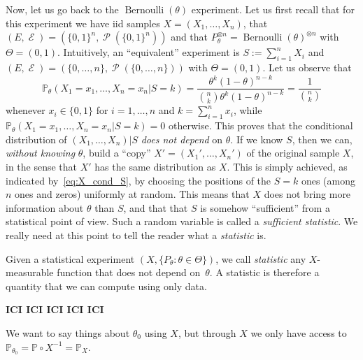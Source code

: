 \documentclass[
	fontsize=11pt, %
	twoside=false, %
	numbers=noenddot, %
]{kaobook}
\DeclareMathOperator{\cE}{\mathcal E}
\DeclareMathOperator{\cP}{\mathcal P}
\DeclareMathOperator{\ber}{Bernoulli}
\renewcommand{\P}{\mathbb P}
\begin{document}
Now, let us go back to the $\ber(\theta)$ experiment.
Let us first recall that for this experiment we have iid samples $X = (X_1, \ldots, X_n)$, that
$(E, \cE) = (\{0, 1\}^n, \cP(\{0, 1\}^n))$ and that $P_\theta^{\otimes n} = \ber(\theta)^{\otimes n}$ with $\Theta = (0, 1)$.
Intuitively, an ``equivalent'' experiment is $S := \sum_{i=1}^n X_i$ and $(E, \cE) = (\{ 0, \ldots, n\}, \cP(\{0, \ldots, n\}))$ with $\Theta = (0, 1)$.
Let us observe that
\begin{equation}
	\label{eq:X_cond_S}
	\P_\theta (X_1 = x_1, \ldots, X_n = x_n | S = k) = 
	\frac{\theta^k (1 - \theta)^{n-k}}{\binom{n}{k} \theta^k (1 - \theta)^{n-k}} 
	= \frac{1}{\binom{n}{k}}
\end{equation}
whenever $x_i \in \{ 0, 1 \}$ for $i=1, \ldots, n$ and $k = \sum_{i=1}^n x_i$, while $\P_\theta (X_1 = x_1, \ldots, X_n = x_n | S = k) = 0$ otherwise.
This proves that the conditional distribution of $(X_1, \ldots, X_n) | S$ \emph{does not depend} on $\theta$.
If we know $S$, then we can, \emph{without knowing} $\theta$, build a ``copy'' $X' = (X_1', \ldots, X_n')$ of the original sample $X$, in the sense that $X'$ has the same distribution as $X$.
This is simply achieved, as indicated by~\eqref{eq:X_cond_S}, by choosing the positions of the $S=k$ ones (among $n$ ones and zeros) uniformly at random.
This means that $X$ does not bring more information about $\theta$ than $S$, and that that $S$ is somehow ``sufficient'' from a statistical point of view.
Such a random variable is called a \emph{sufficient statistic}.
We really need at this point to tell the reader what a \emph{statistic} is.
\begin{definition}
	Given a statistical experiment $(X, \{ P_\theta : \theta \in \Theta \})$, we call \emph{statistic} any $X$-measurable function that does not depend on~$\theta$.
	A statistic is therefore a quantity that we can compute using only data.
\end{definition}

\textbf{ICI ICI ICI ICI ICI}





We want to say things about $\theta_0$ using $X$, but through $X$ we only have access to $\P_{\theta_0} = \P \circ X^{-1} = \P_X$.
\end{document}
